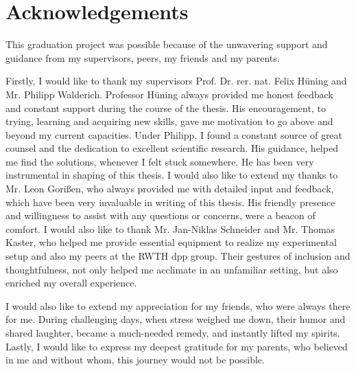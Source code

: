 \chapter*{Acknowledgements}
This graduation project was possible because of the unwavering support and guidance from my supervisors, peers, my friends and my parents.

\vspace{5mm}

\noindent Firstly, I would like to thank my supervisors Prof. Dr. rer. nat. Felix Hüning and Mr. Philipp Walderich. Professor Hüning always provided me honest feedback and constant support during the course of the thesis. His encouragement, to trying, learning and acquiring new skills, gave me motivation to go above and beyond my current capacities. Under Philipp, I found a constant source of great counsel and the dedication to excellent scientific research. His guidance, helped me find the solutions, whenever I felt stuck somewhere. He has been very instrumental in shaping of this thesis. I would also like to extend my thanks to Mr. Leon Gorißen, who always provided me with detailed input and feedback, which have been very invaluable in writing of this thesis. His friendly presence and willingness to assist with any questions or concerns, were a beacon of comfort. I would also like to thank Mr. Jan-Niklas Schneider and Mr. Thomas Kaster, who helped me provide essential equipment to realize my experimental setup and also my peers at the RWTH \gls{dpp} group. Their gestures of inclusion and thoughtfulness, not only helped me acclimate in an unfamiliar setting, but also enriched my overall experience.

\vspace{5mm}

\noindent I would also like to extend my appreciation for my friends, who were always there for me. During challenging days, when stress weighed me down, their humor and shared laughter, became a much-needed remedy, and instantly lifted my spirits. Lastly, I would like to express my deepest gratitude for my parents, who believed in me and without whom, this journey would not be possible.